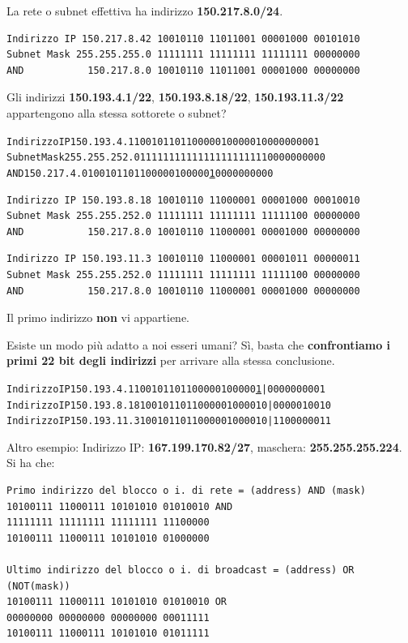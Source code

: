 \documentclass[11pt,a4paper,oneside]{book}
\theoremstyle{definition}
\begin{document}
La rete o subnet effettiva ha indirizzo \textbf{150.217.8.0/24}.
\begin{verbatim}
Indirizzo IP 150.217.8.42 10010110 11011001 00001000 00101010
Subnet Mask 255.255.255.0 11111111 11111111 11111111 00000000
AND           150.217.8.0 10010110 11011001 00001000 00000000
\end{verbatim}
Gli indirizzi \textbf{150.193.4.1/22}, \textbf{150.193.8.18/22}, \textbf{150.193.11.3/22} appartengono alla stessa sottorete o subnet?
\begin{alltt}
	Indirizzo IP 150.193.4.1  10010110 11000001 00000100 00000001
	Subnet Mask 255.255.252.0 11111111 11111111 11111100 00000000
	AND           150.217.4.0 10010110 11000001 00000\underline{1}00 00000000
\end{alltt}
\begin{verbatim}
Indirizzo IP 150.193.8.18 10010110 11000001 00001000 00010010
Subnet Mask 255.255.252.0 11111111 11111111 11111100 00000000
AND           150.217.8.0 10010110 11000001 00001000 00000000
\end{verbatim}
\begin{verbatim}
Indirizzo IP 150.193.11.3 10010110 11000001 00001011 00000011
Subnet Mask 255.255.252.0 11111111 11111111 11111100 00000000
AND           150.217.8.0 10010110 11000001 00001000 00000000
\end{verbatim}
Il primo indirizzo \textbf{non} vi appartiene.

Esiste un modo più adatto a noi esseri umani? Sì, basta che \textbf{confrontiamo i primi 22 bit degli indirizzi} per arrivare alla stessa conclusione.

\begin{alltt}
	Indirizzo IP 150.193.4.1  10010110 11000001 00000\underline{1} | 00 00000001
	Indirizzo IP 150.193.8.18 10010110 11000001 000010 | 00 00010010
	Indirizzo IP 150.193.11.3 10010110 11000001 000010 | 11 00000011
\end{alltt}

Altro esempio:\newline
Indirizzo IP: \textbf{167.199.170.82/27}, maschera: \textbf{255.255.255.224}. Si ha che:
\begin{verbatim}
Primo indirizzo del blocco o i. di rete = (address) AND (mask)
10100111 11000111 10101010 01010010 AND
11111111 11111111 11111111 11100000
10100111 11000111 10101010 01000000

Ultimo indirizzo del blocco o i. di broadcast = (address) OR (NOT(mask))
10100111 11000111 10101010 01010010 OR
00000000 00000000 00000000 00011111
10100111 11000111 10101010 01011111
\end{verbatim}
\end{document}
